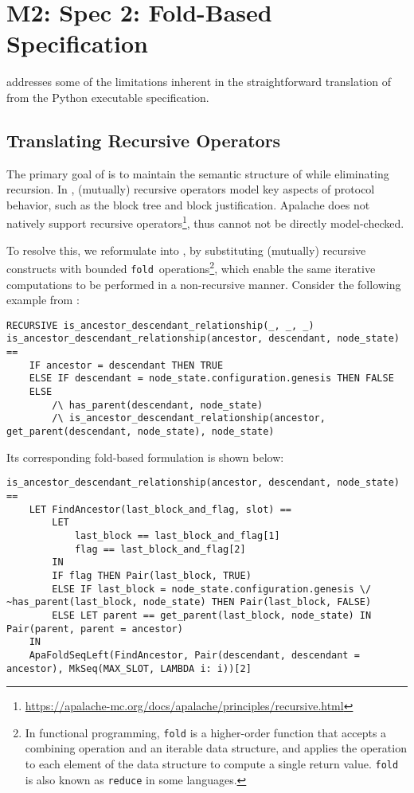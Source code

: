 
\section{M2: Spec 2: Fold-Based Specification}

\SpecTwo{} addresses some of the limitations inherent in the straightforward
translation of \SpecOne{} from the Python executable specification.

\subsection{Translating Recursive \tlap{} Operators}

The primary goal of \SpecTwo{} is to maintain the semantic structure of
\SpecOne{} while eliminating recursion. In \SpecOne{}, (mutually) recursive
operators model key aspects of protocol behavior, such as the block tree and
block justification. Apalache does not natively support recursive
operators\footnote{\url{https://apalache-mc.org/docs/apalache/principles/recursive.html}},
thus \SpecOne{} cannot not be directly model-checked.

To resolve this, we reformulate \SpecOne{} into \SpecTwo{}, by substituting
(mutually) recursive constructs with bounded
\texttt{fold}~operations\footnote{In functional programming, \texttt{fold} is a
higher-order function that accepts a combining operation and an iterable data
structure, and applies the operation to each element of the data structure
to compute a single return value. \texttt{fold} is also known as
\texttt{reduce} in some languages.}, which enable the same iterative
computations to be performed in a non-recursive manner. Consider the following
example from \SpecOne{}:

\begin{lstlisting}[language=tla]
RECURSIVE is_ancestor_descendant_relationship(_, _, _)
is_ancestor_descendant_relationship(ancestor, descendant, node_state) ==
    IF ancestor = descendant THEN TRUE
    ELSE IF descendant = node_state.configuration.genesis THEN FALSE
    ELSE
        /\ has_parent(descendant, node_state)
        /\ is_ancestor_descendant_relationship(ancestor, get_parent(descendant, node_state), node_state)
\end{lstlisting}

Its corresponding fold-based formulation is shown below:

\begin{lstlisting}[language=tla]
is_ancestor_descendant_relationship(ancestor, descendant, node_state) ==
    LET FindAncestor(last_block_and_flag, slot) ==
        LET
            last_block == last_block_and_flag[1]
            flag == last_block_and_flag[2]
        IN
        IF flag THEN Pair(last_block, TRUE)
        ELSE IF last_block = node_state.configuration.genesis \/ ~has_parent(last_block, node_state) THEN Pair(last_block, FALSE)
        ELSE LET parent == get_parent(last_block, node_state) IN Pair(parent, parent = ancestor)
    IN
    ApaFoldSeqLeft(FindAncestor, Pair(descendant, descendant = ancestor), MkSeq(MAX_SLOT, LAMBDA i: i))[2]
\end{lstlisting}

